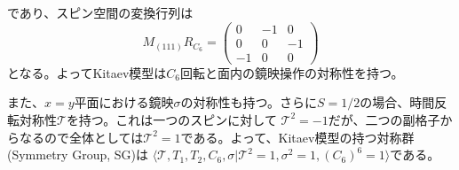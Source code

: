\documentclass[11pt, aps, longbibliography]{article}
\begin{document}
        であり、スピン空間の変換行列は
        \begin{equation}\label{eq:Kit-Sym-3}
            M_{(111)}R_{C_6} = \begin{pmatrix}
                0 & -1 & 0 \\ 0 & 0 & -1 \\ -1 & 0 & 0
            \end{pmatrix}
        \end{equation}
        となる。よってKitaev模型は$C_6$回転と面内の鏡映操作の対称性を持つ。

        また、$x=y$平面における鏡映$\sigma$の対称性も持つ。さらに$S=1/2$の場合、時間反転対称性$\mathcal{T}$を持つ。これは一つのスピンに対して
        $\mathcal{T}^2 = -1$だが、二つの副格子からなるので全体としては$\mathcal{T}^2 = 1$である。よって、Kitaev模型の持つ対称群(Symmetry Group, SG)は
        $\langle \mathcal{T}, T_1, T_2, C_6, \sigma | \mathcal{T}^2=1, \sigma^2 = 1, (C_6)^6=1 \rangle$である。
\end{document}
